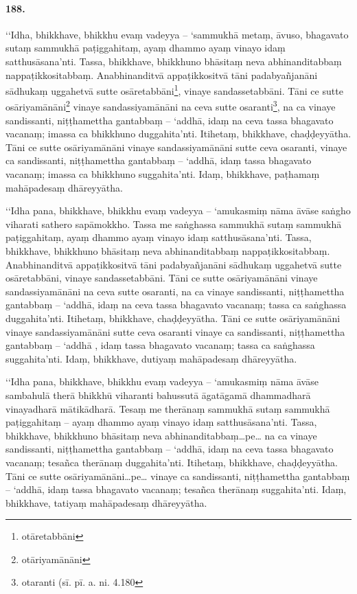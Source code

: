 \paragraph{188.} ‘‘Idha, bhikkhave, bhikkhu evaṃ vadeyya – ‘sammukhā metaṃ, āvuso, bhagavato sutaṃ sammukhā paṭiggahitaṃ, ayaṃ dhammo ayaṃ vinayo idaṃ satthusāsana’nti. Tassa, bhikkhave, bhikkhuno bhāsitaṃ neva abhinanditabbaṃ nappaṭikkositabbaṃ. Anabhinanditvā appaṭikkositvā tāni padabyañjanāni sādhukaṃ uggahetvā sutte osāretabbāni\footnote{otāretabbāni}, vinaye sandassetabbāni. Tāni ce sutte osāriyamānāni\footnote{otāriyamānāni} vinaye sandassiyamānāni na ceva sutte osaranti\footnote{otaranti (sī. pī. a. ni. 4.180}, na ca vinaye sandissanti, niṭṭhamettha gantabbaṃ – ‘addhā, idaṃ na ceva tassa bhagavato vacanaṃ; imassa ca bhikkhuno duggahita’nti. Itihetaṃ, bhikkhave, chaḍḍeyyātha. Tāni ce sutte osāriyamānāni vinaye sandassiyamānāni sutte ceva osaranti, vinaye ca sandissanti, niṭṭhamettha gantabbaṃ – ‘addhā, idaṃ tassa bhagavato vacanaṃ; imassa ca bhikkhuno suggahita’nti. Idaṃ, bhikkhave, paṭhamaṃ mahāpadesaṃ dhāreyyātha.

‘‘Idha pana, bhikkhave, bhikkhu evaṃ vadeyya – ‘amukasmiṃ nāma āvāse saṅgho viharati sathero sapāmokkho. Tassa me saṅghassa sammukhā sutaṃ sammukhā paṭiggahitaṃ, ayaṃ dhammo ayaṃ vinayo idaṃ satthusāsana’nti. Tassa, bhikkhave, bhikkhuno bhāsitaṃ neva abhinanditabbaṃ nappaṭikkositabbaṃ. Anabhinanditvā appaṭikkositvā tāni padabyañjanāni sādhukaṃ uggahetvā sutte osāretabbāni, vinaye sandassetabbāni. Tāni ce sutte osāriyamānāni vinaye sandassiyamānāni na ceva sutte osaranti, na ca vinaye sandissanti, niṭṭhamettha gantabbaṃ – ‘addhā, idaṃ na ceva tassa bhagavato vacanaṃ; tassa ca saṅghassa duggahita’nti. Itihetaṃ, bhikkhave, chaḍḍeyyātha. Tāni ce sutte osāriyamānāni vinaye sandassiyamānāni sutte ceva osaranti vinaye ca sandissanti, niṭṭhamettha gantabbaṃ – ‘addhā , idaṃ tassa bhagavato vacanaṃ; tassa ca saṅghassa suggahita’nti. Idaṃ, bhikkhave, dutiyaṃ mahāpadesaṃ dhāreyyātha.

‘‘Idha pana, bhikkhave, bhikkhu evaṃ vadeyya – ‘amukasmiṃ nāma āvāse sambahulā therā bhikkhū viharanti bahussutā āgatāgamā dhammadharā vinayadharā mātikādharā. Tesaṃ me therānaṃ sammukhā sutaṃ sammukhā paṭiggahitaṃ – ayaṃ dhammo ayaṃ vinayo idaṃ satthusāsana’nti. Tassa, bhikkhave, bhikkhuno bhāsitaṃ neva abhinanditabbaṃ…pe… na ca vinaye sandissanti, niṭṭhamettha gantabbaṃ – ‘addhā, idaṃ na ceva tassa bhagavato vacanaṃ; tesañca therānaṃ duggahita’nti. Itihetaṃ, bhikkhave, chaḍḍeyyātha. Tāni ce sutte osāriyamānāni…pe… vinaye ca sandissanti, niṭṭhamettha gantabbaṃ – ‘addhā, idaṃ tassa bhagavato vacanaṃ; tesañca therānaṃ suggahita’nti. Idaṃ, bhikkhave, tatiyaṃ mahāpadesaṃ dhāreyyātha.

